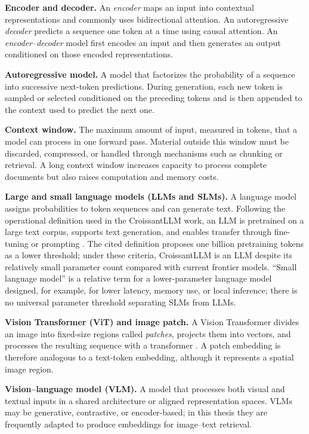 \noindent\textbf{Encoder and decoder.}
An \emph{encoder} maps an input into contextual representations and commonly
uses bidirectional attention. An autoregressive \emph{decoder} predicts a
sequence one token at a time using causal attention. An
\emph{encoder--decoder} model first encodes an input and then generates an
output conditioned on those encoded representations.

\noindent\textbf{Autoregressive model.}
A model that factorizes the probability of a sequence into successive
next-token predictions. During generation, each new token is sampled or selected
conditioned on the preceding tokens and is then appended to the context used to
predict the next one.

\noindent\textbf{Context window.}
The maximum amount of input, measured in tokens, that a model can process in one
forward pass. Material outside this window must be discarded, compressed, or
handled through mechanisms such as chunking or retrieval. A long context window
increases capacity to process complete documents but also raises computation
and memory costs.

\noindent\textbf{Large and small language models (LLMs and SLMs).}
A language model assigns probabilities to token sequences and can generate text.
Following the operational definition used in the CroissantLLM work, an LLM is
pretrained on a large text corpus, supports text generation, and enables
transfer through fine-tuning or prompting .
The cited definition proposes one billion pretraining tokens as a lower
threshold; under these criteria, CroissantLLM is an LLM despite its relatively
small parameter count compared with current frontier models.
``Small language model'' is a relative term for a lower-parameter language model
designed, for example, for lower latency, memory use, or local inference; there
is no universal parameter threshold separating SLMs from LLMs.

\noindent\textbf{Vision Transformer (ViT) and image patch.}
A Vision Transformer divides an image into fixed-size regions called
\emph{patches}, projects them into vectors, and processes the resulting sequence
with a transformer . A patch embedding is
therefore analogous to a text-token embedding, although it represents a spatial
image region.

\noindent\textbf{Vision--language model (VLM).}
A model that processes both visual and textual inputs in a shared architecture
or aligned representation spaces. VLMs may be generative, contrastive, or
encoder-based; in this thesis they are frequently adapted to produce embeddings
for image--text retrieval.

